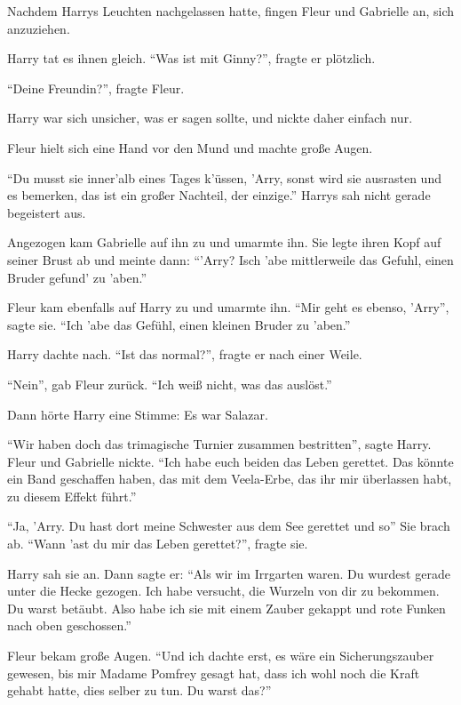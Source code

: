 Nachdem Harrys Leuchten nachgelassen hatte, fingen Fleur und Gabrielle an, sich anzuziehen.

Harry tat es ihnen gleich. \enquote{Was ist mit Ginny?}, fragte er plötzlich.

\enquote{Deine Freundin?}, fragte Fleur.

Harry war sich unsicher, was er sagen sollte, und nickte daher einfach nur.

Fleur hielt sich eine Hand vor den Mund und machte große Augen.

\enquote{Du musst sie inner'alb eines Tages k'üssen, 'Arry, sonst wird sie ausrasten und es bemerken, das ist ein großer Nachteil, der einzige.} Harrys sah nicht gerade begeistert aus.

Angezogen kam Gabrielle auf ihn zu und umarmte ihn. Sie legte ihren Kopf auf seiner Brust ab und meinte dann: \enquote{'Arry? Isch 'abe mittlerweile das Gefuhl, einen Bruder gefund' zu 'aben.}

Fleur kam ebenfalls auf Harry zu und umarmte ihn. \enquote{Mir geht es ebenso, 'Arry}, sagte sie. \enquote{Ich 'abe das Gefühl, einen kleinen Bruder zu 'aben.}

Harry dachte nach. \enquote{Ist das normal?}, fragte er nach einer Weile.

\enquote{Nein}, gab Fleur zurück. \enquote{Ich weiß nicht, was das auslöst.}

Dann hörte Harry eine Stimme:  Es war Salazar.

\enquote{Wir haben doch das trimagische Turnier zusammen bestritten}, sagte Harry. Fleur und Gabrielle nickte. \enquote{Ich habe euch beiden das Leben gerettet. Das könnte ein Band geschaffen haben, das mit dem Veela-Erbe, das ihr mir überlassen habt, zu diesem Effekt führt.}

\enquote{Ja, 'Arry. Du hast dort meine Schwester aus dem See gerettet und so\abs} Sie brach ab. \enquote{Wann 'ast du mir das Leben gerettet?}, fragte sie.

Harry sah sie an. Dann sagte er: \enquote{Als wir im Irrgarten waren. Du wurdest gerade unter die Hecke gezogen. Ich habe versucht, die Wurzeln von dir zu bekommen. Du warst betäubt. Also habe ich sie mit einem Zauber gekappt und rote Funken nach oben geschossen.}

Fleur bekam große Augen. \enquote{Und ich dachte erst, es wäre ein Sicherungszauber gewesen, bis mir Madame Pomfrey gesagt hat, dass ich wohl noch die Kraft gehabt hatte, dies selber zu tun. \gst Du warst das?}

